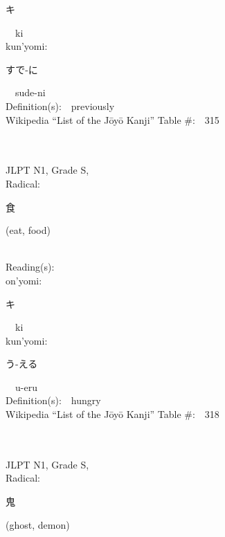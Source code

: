 \begin{multicols}{2}
{\hspace*{2em}}{\begin{CJK}{UTF8}{min} キ \end{CJK}}\ \ ki\ \ \\
{\hspace*{1em}}kun'yomi:\ \ \\
{\hspace*{2em}}{\begin{CJK}{UTF8}{min} すで-に \end{CJK}}\ \ sude-ni\ \ \\
Definition(s):\ \ previously \\
Wikipedia ``List of the J\=oy\=o Kanji'' Table \#:\ \ 315 \\
\ \ \\
{\fontsize{34pt}{40pt}  }\ \ \\
{JLPT N1, Grade S, \\Radical:\ \ {\begin{CJK}{UTF8}{min} 食 \end{CJK}} (eat, food) } \\
Reading(s):\ \ \\
{\hspace*{1em}}on'yomi:\ \ \\
{\hspace*{2em}}{\begin{CJK}{UTF8}{min} キ \end{CJK}}\ \ ki\ \ \\
{\hspace*{1em}}kun'yomi:\ \ \\
{\hspace*{2em}}{\begin{CJK}{UTF8}{min} う-える \end{CJK}}\ \ u-eru\ \ \\
Definition(s):\ \ hungry \\
Wikipedia ``List of the J\=oy\=o Kanji'' Table \#:\ \ 318 \\
\ \ \\
{\fontsize{34pt}{40pt}  }\ \ \\
{JLPT N1, Grade S, \\Radical:\ \ {\begin{CJK}{UTF8}{min} 鬼 \end{CJK}} (ghost, demon) } \\

\end{multicols}

